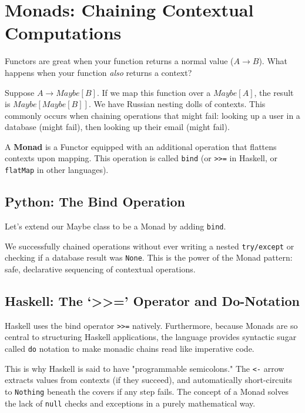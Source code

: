 \section{Monads: Chaining Contextual Computations}

Functors are great when your function returns a normal value ($A \rightarrow B$). What happens when your function \textit{also} returns a context?

Suppose $A \rightarrow Maybe[B]$. If we map this function over a $Maybe[A]$, the result is $Maybe[Maybe[B]]$. We have Russian nesting dolls of contexts. This commonly occurs when chaining operations that might fail: looking up a user in a database (might fail), then looking up their email (might fail).

A \textbf{Monad} is a Functor equipped with an additional operation that flattens contexts upon mapping. This operation is called \texttt{bind} (or \texttt{>>=} in Haskell, or \texttt{flatMap} in other languages). 

\subsection{Python: The Bind Operation}
Let's extend our Maybe class to be a Monad by adding \texttt{bind}.



We successfully chained operations without ever writing a nested \texttt{try/except} or checking if a database result was \texttt{None}. This is the power of the Monad pattern: safe, declarative sequencing of contextual operations.

\subsection{Haskell: The `>>=' Operator and Do-Notation}

Haskell uses the bind operator \texttt{>>=} natively. Furthermore, because Monads are so central to structuring Haskell applications, the language provides syntactic sugar called \texttt{do} notation to make monadic chains read like imperative code.



This is why Haskell is said to have "programmable semicolons." The \texttt{<-} arrow extracts values from contexts (if they succeed), and automatically short-circuits to \texttt{Nothing} beneath the covers if any step fails. The concept of a Monad solves the lack of \texttt{null} checks and exceptions in a purely mathematical way.


